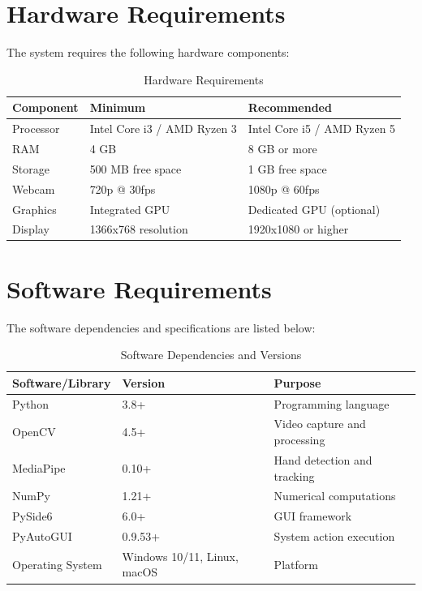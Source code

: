 \documentclass[12pt,a4paper]{report}
\begin{document}
\section{Hardware Requirements}

The system requires the following hardware components:

\begin{table}[H]
\centering
\caption{Hardware Requirements}
\label{tab:hardware}
\begin{tabular}{|l|l|l|}
\hline
\textbf{Component} & \textbf{Minimum} & \textbf{Recommended} \\ \hline
Processor & Intel Core i3 / AMD Ryzen 3 & Intel Core i5 / AMD Ryzen 5 \\ \hline
RAM & 4 GB & 8 GB or more \\ \hline
Storage & 500 MB free space & 1 GB free space \\ \hline
Webcam & 720p @ 30fps & 1080p @ 60fps \\ \hline
Graphics & Integrated GPU & Dedicated GPU (optional) \\ \hline
Display & 1366x768 resolution & 1920x1080 or higher \\ \hline
\end{tabular}
\end{table}

\section{Software Requirements}

The software dependencies and specifications are listed below:

\begin{table}[H]
\centering
\caption{Software Dependencies and Versions}
\label{tab:software}
\begin{tabular}{|l|l|l|}
\hline
\textbf{Software/Library} & \textbf{Version} & \textbf{Purpose} \\ \hline
Python & 3.8+ & Programming language \\ \hline
OpenCV & 4.5+ & Video capture and processing \\ \hline
MediaPipe & 0.10+ & Hand detection and tracking \\ \hline
NumPy & 1.21+ & Numerical computations \\ \hline
PySide6 & 6.0+ & GUI framework \\ \hline
PyAutoGUI & 0.9.53+ & System action execution \\ \hline
Operating System & Windows 10/11, Linux, macOS & Platform \\ \hline
\end{tabular}
\end{table}
\end{document}
